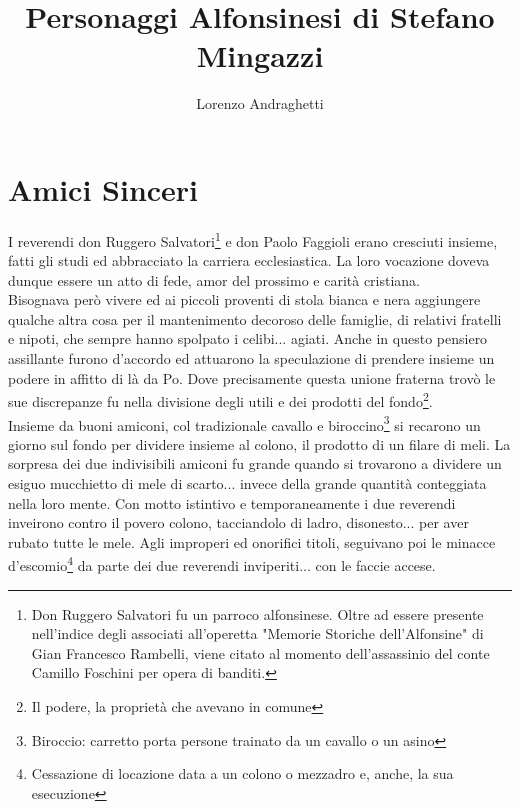 \documentclass[10pt]{memoir} %
\title{Personaggi Alfonsinesi di Stefano Mingazzi} %
\author{Lorenzo Andraghetti} %
\begin{document}


\cleardoublepage

\cleardoublepage
\pagestyle{plain}\renewcommand{\chaptermark}[1]{\markboth{\chaptername\ \thechapter.\ #1}{}} 
\renewcommand{\sectionmark}[1]{\markright{\thesection.\ #1}}  









\chapter{Amici Sinceri}
I reverendi don Ruggero Salvatori\footnote{Don Ruggero Salvatori fu un parroco alfonsinese. Oltre ad essere presente nell'indice degli associati all'operetta "Memorie Storiche dell'Alfonsine" di Gian Francesco Rambelli, viene citato al momento dell'assassinio del conte Camillo Foschini per opera di banditi.} e don Paolo Faggioli erano cresciuti insieme, fatti gli studi ed abbracciato la carriera ecclesiastica. La loro vocazione doveva dunque essere un atto di fede, amor del prossimo e carità cristiana.\\
Bisognava però vivere ed ai piccoli proventi di stola bianca e nera aggiungere qualche altra cosa per il mantenimento decoroso delle famiglie, di relativi fratelli e nipoti, che sempre hanno spolpato i celibi... agiati. Anche in questo pensiero assillante furono d'accordo ed attuarono la speculazione di prendere insieme un podere in affitto di là da Po. Dove precisamente questa unione fraterna trovò le sue discrepanze fu nella divisione degli utili e dei prodotti del fondo\footnote{Il podere, la proprietà che avevano in comune}. \\
Insieme da buoni amiconi, col tradizionale cavallo e biroccino\footnote{Biroccio: carretto porta persone trainato da un cavallo o un asino} si recarono un giorno sul fondo per dividere insieme al colono, il prodotto di un filare di meli. La sorpresa dei due indivisibili amiconi fu grande quando si trovarono a dividere un esiguo mucchietto di mele di scarto... invece della grande quantità conteggiata nella loro mente. Con motto istintivo e temporaneamente i due reverendi inveirono contro il povero colono, tacciandolo di ladro, disonesto... per aver rubato tutte le mele. Agli improperi ed onorifici titoli, seguivano poi le minacce d’escomio\footnote{Cessazione di locazione data a un colono o mezzadro e, anche, la sua esecuzione} da parte dei due reverendi inviperiti... con le faccie accese.\\
\end{document}
